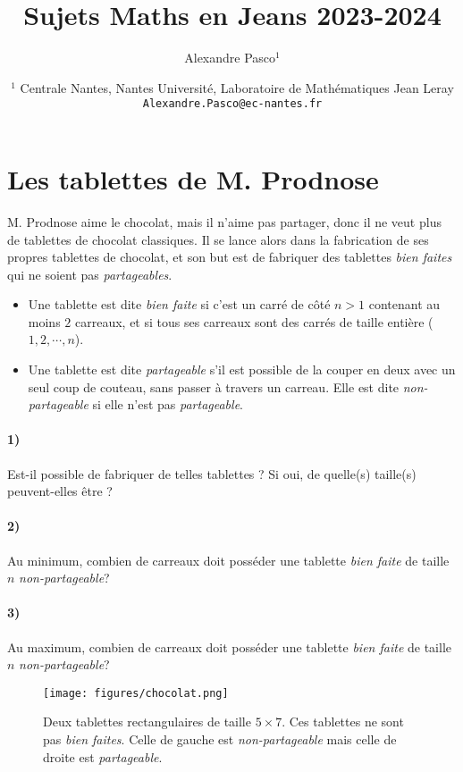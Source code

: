 \documentclass[a4paper,10pt,oneside]{article}
\title{Sujets Maths en Jeans 2023-2024}
\author{
  Alexandre Pasco${}^{1}$}
\date{\medskip%
  \small %
  ${}^1$  Centrale Nantes, Nantes Université, Laboratoire de Mathématiques Jean Leray\\
  \texttt{Alexandre.Pasco@ec-nantes.fr}
  }
\begin{document}
\maketitle


\clearpage
\section{Les tablettes de M. Prodnose}

M. Prodnose aime le chocolat, mais il n'aime pas partager, donc il ne veut plus de tablettes de chocolat classiques.
Il se lance alors dans la fabrication de ses propres tablettes de chocolat, et son but est de fabriquer des tablettes \textit{bien faites} qui ne soient pas \textit{partageables}.
\begin{itemize}
  \item Une tablette est dite \textit{bien faite} si c'est un carré de côté $n>1$ contenant au moins $2$ carreaux, et si tous ses carreaux sont des carrés de taille entière ($1,2,\cdots, n$).
  \item Une tablette est dite \textit{partageable} s'il est possible de la couper en deux avec un seul coup de couteau, sans passer à travers un carreau.
  Elle est dite \textit{non-partageable} si elle n'est pas \textit{partageable}.
\end{itemize}

\paragraph*{1)} 
Est-il possible de fabriquer de telles tablettes ?
Si oui, de quelle(s) taille(s) peuvent-elles être ? 

\paragraph*{2)} 
Au minimum, combien de carreaux doit posséder une tablette \textit{bien faite} de taille $n$ \textit{non-partageable}?

\paragraph*{3)} 
Au maximum, combien de carreaux doit posséder une tablette \textit{bien faite} de taille $n$ \textit{non-partageable}?

\vspace{3cm}
\begin{figure}[!ht]
  \centering
  \texttt{[image: figures/chocolat.png]}
  \caption*{Deux tablettes rectangulaires de taille $5\times 7$. 
  Ces tablettes ne sont pas \textit{bien faites}.
  Celle de gauche est \textit{non-partageable} mais celle de droite est \textit{partageable}.}
\end{figure}
\end{document}
